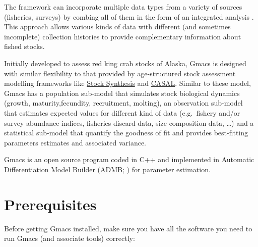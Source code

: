 \documentclass[
]{book}
\begin{document}
The framework can incorporate multiple data types from a variety of sources (fisheries, surveys) by combing all of them in the form of an integrated analysis \citep{maunder_review_2013, punt_review_2013}. This approach allows various kinds of data with different (and sometimes incomplete) collection histories to provide complementary information about fished stocks.

Initially developed to assess red king crab stocks of Alaska, Gmacs is designed with similar flexibility to that provided by age-structured stock assessment modelling frameworks like \href{https://vlab.noaa.gov/web/stock-synthesis}{Stock Synthesis} and \href{https://niwa.co.nz/fisheries/tools-resources/casal}{CASAL}. Similar to these model, Gmacs has a population sub-model that simulates stock biological dynamics (growth, maturity,fecundity, recruitment, molting), an observation sub-model that estimates expected values for different kind of data (e.g.~fishery and/or survey abundance indices, fisheries discard data, size composition data, \ldots) and a statistical sub-model that quantify the goodness of fit and provides best-fitting parameters estimates and associated variance.

Gmacs is an open source program coded in C++ and implemented in Automatic Differentiation Model Builder (\href{http://www.admb-project.org/}{ADMB}; \citet{fournier_ad_2012}) for parameter estimation.

\hypertarget{prerequisites}{%
\section*{Prerequisites}\label{prerequisites}}

Before getting Gmacs installed, make sure you have all the software you need to run Gmacs (and associate tools) correctly:
\end{document}
